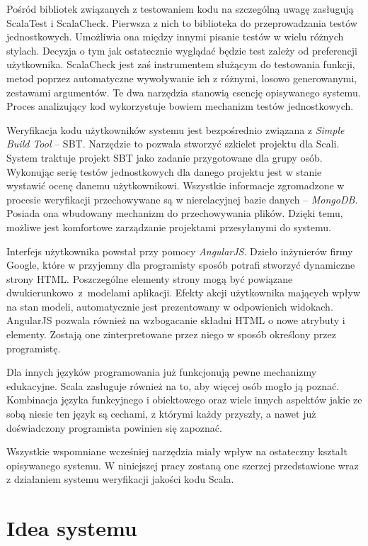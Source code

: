 \documentclass[wimgr]{xmgr}
\begin{document}
Pośród bibliotek związanych z testowaniem kodu na szczególną uwagę zasługują ScalaTest i ScalaCheck. Pierwsza z nich to biblioteka do przeprowadzania testów jednostkowych. Umożliwia ona między innymi pisanie testów w wielu różnych stylach. Decyzja o tym jak ostatecznie wyglądać będzie test zależy od preferencji użytkownika. ScalaCheck jest zaś instrumentem służącym do testowania funkcji, metod poprzez automatyczne wywoływanie ich z różnymi, losowo generowanymi, zestawami argumentów. Te dwa narzędzia stanowią esencję opisywanego systemu. Proces analizujący kod wykorzystuje bowiem mechanizm testów jednostkowych.  

Weryfikacja kodu użytkowników systemu jest bezpośrednio związana z \emph{Simple Build Tool} -- SBT. Narzędzie to pozwala stworzyć szkielet projektu dla Scali. System traktuje projekt SBT jako zadanie przygotowane dla grupy osób. Wykonując serię testów jednostkowych dla danego projektu jest w stanie wystawić ocenę danemu użytkownikowi. Wszystkie informacje zgromadzone w procesie weryfikacji przechowywane są w nierelacyjnej bazie danych -- \emph{MongoDB}. Posiada ona wbudowany mechanizm do przechowywania plików. Dzięki temu, możliwe jest komfortowe zarządzanie projektami przesyłanymi do systemu.

Interfejs użytkownika powstał przy pomocy \emph{AngularJS}. Dzieło inżynierów firmy Google, które w przyjemny dla programisty sposób potrafi stworzyć dynamiczne strony HTML. Poszczególne elementy strony mogą być powiązane dwukierunkowo~z~modelami aplikacji. Efekty akcji użytkownika mających wpływ na stan modeli, automatycznie jest prezentowany w odpowienich widokach. AngularJS pozwala również na wzbogacanie składni HTML o nowe atrybuty i elementy. Zostają one zinterpretowane przez niego w sposób określony przez programistę.

Dla innych języków programowania już funkcjonują pewne mechanizmy edukacyjne. Scala zasługuje również na to, aby więcej osób mogło ją poznać. Kombinacja języka funkcyjnego i obiektowego oraz wiele innych aspektów jakie ze sobą niesie ten język są cechami, z którymi każdy przyszły, a nawet już doświadczony programista powinien się zapoznać. 

Wszystkie wspomniane wcześniej narzędzia miały wpływ na ostateczny kształt opisywanego systemu. W niniejszej pracy zostaną one szerzej przedstawione wraz z działaniem systemu weryfikacji jakości kodu Scala.

\chapter{Idea systemu}
\end{document}
